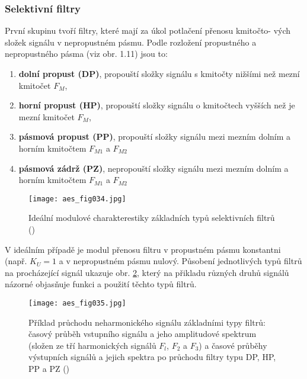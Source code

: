        \subsubsection{Selektivní filtry}
          První skupinu tvoří filtry, které mají za úkol potlačení přenosu kmitočto- vých složek
          signálu v nepropustném pásmu. Podle rozložení propustného a nepropustného pásma (viz obr.
          1.11) jsou to:
          \begin{enumerate}[leftmargin=2cm,rightmargin=1cm, label=\emph{\alph*}),noitemsep]
            \item \textbf{dolní propust (DP)}, propouští složky signálu s kmitočty nižšími než mezní
                  kmitočet \(F_M\), 
            \item \textbf{horní propust (HP)}, propouští složky signálu o kmitočtech vyšších než je
                  mezní kmitočet \(F_M\), 
            \item \textbf{pásmová propust (PP)}, propouští složky signálu mezi mezním dolním a
                  horním kmitočtem \(F_{M1}\) a \(F_{M2}\) 
            \item \textbf{pásmová zádrž (PZ)}, nepropouští složky signálu mezi mezním dolním a
                  horním kmitočtem \(F_{M1}\) a \(F_{M2}\)    
          \end{enumerate}

          \begin{figure}[ht!]  %
            \centering
            \texttt{[image: aes\_fig034.jpg]}
            \caption{Ideální modulové charakterestiky základních typů selektivních filtrů
                     (\cite[s.~34]{HajekSedlacek2002})}
            \label{aes:fig034}    
          \end{figure}

          V ideálním případě je modul přenosu filtru v propustném pásmu konstantni (např. \(K_U =
          1\) a v nepropustném pásmu nulový. Působení jednotlivých typů filtrů na procházející
          signál ukazuje obr. \ref{aes:fig035}, který na přikladu různých druhů signálů názorné
          objasňuje funkci a použití těchto typů filtrů. 

          \begin{figure}[ht!]  %
            \centering
            \texttt{[image: aes\_fig035.jpg]}
            \caption{Příklad průchodu neharmonického signálu základními typy filtrů: časový průběh
                    vstupního signálu a jeho amplitudové spektrum (složen ze tří harmonických
                    signálů \(F_l\), \(F_2\) a \(F_3\)) a časové průběhy výstupních signálů a jejich
                    spektra po průchodu filtry typu DP, HP, PP a PZ
                    (\cite[s.~35]{HajekSedlacek2002})}
            \label{aes:fig035}    
          \end{figure}
        
